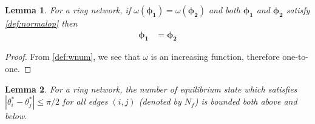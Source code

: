 \documentclass[10pt,aps,pra,onecolumn,superscriptaddress]{revtex4-1}
\renewcommand{\vec}[1]{\boldsymbol{#1}}
\newtheorem{lemma}{Lemma}
\begin{document}
\begin{lemma}
\label{lem:wind-fp-corr}
For a ring network, if $\omega(\vec{\phi_1})=\omega(\vec{\phi_2})$ and both 
$\vec{\phi_1}$ and $\vec{\phi_2}$ satisfy \eqref{def:normalop} then 
\begin{align}
\label{}
\vec{\phi_1}&=\vec{\phi_2}
\end{align}
\end{lemma}


\begin{proof}
From \eqref{def:wnum}, we see that $\omega$ is an increasing function, therefore one-to-one.  
\end{proof}


\begin{lemma}
For a ring network, the number of equilibrium state which satisfies 
$|\theta_i^*  - \theta_j^*| \le \pi/2$ for all edges $(i,j)$  (denoted by $N_f$)
is bounded both above and below.  
\end{lemma}
\end{document}
